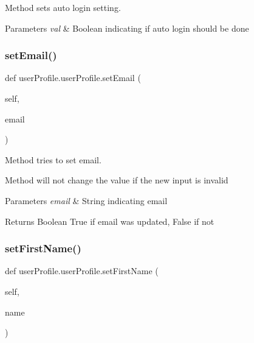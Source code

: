 Method sets auto login setting. 


\begin{DoxyParams}{Parameters}
{\em val} & Boolean indicating if auto login should be done \\
\hline
\end{DoxyParams}
\mbox{\label{classuserProfile_1_1userProfile_a6420f8a55919d59d5d357b9ed93cb279}} 
\subsubsection{\texorpdfstring{set\+Email()}{setEmail()}}
{\footnotesize\ttfamily def user\+Profile.\+user\+Profile.\+set\+Email (\begin{DoxyParamCaption}\item[{}]{self,  }\item[{}]{email }\end{DoxyParamCaption})}



Method tries to set email. 

Method will not change the value if the new input is invalid 
\begin{DoxyParams}{Parameters}
{\em email} & String indicating email \\
\hline
\end{DoxyParams}
\begin{DoxyReturn}{Returns}
Boolean True if email was updated, False if not 
\end{DoxyReturn}
\mbox{\label{classuserProfile_1_1userProfile_aafd4f084d296a83fb1ac2ff703aaa251}} 
\subsubsection{\texorpdfstring{set\+First\+Name()}{setFirstName()}}
{\footnotesize\ttfamily def user\+Profile.\+user\+Profile.\+set\+First\+Name (\begin{DoxyParamCaption}\item[{}]{self,  }\item[{}]{name }\end{DoxyParamCaption})}



